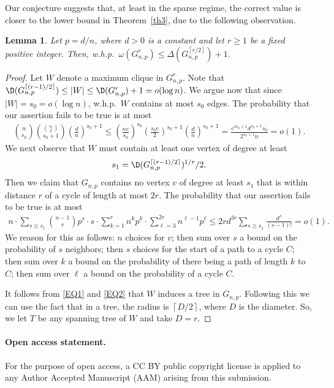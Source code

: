 \documentclass[12pt,a4paper]{article}
\newtheorem{lemma}[theorem]{Lemma}
\newcommand{\rdup}[1]{{\left\lceil #1\right\rceil }}
\newcommand{\bfrac}[2]{\left(\frac{#1}{#2}\right)}
\newcommand{\beq}[2]{\begin{align}\label{#1}#2\end{align}}
\theoremstyle{plain}
\begin{document}
Our conjecture suggests that, at least  in the sparse regime, the correct value is closer to the lower bound in Theorem~\ref{th3}, due to the following observation.
\begin{lemma}\label{omom}
Let $p=d/n$, where $d>0$ is a constant and let $r\geq 1$ be a fixed positive integer. Then, w.h.p.~$\omega(G_{n,p}^r)\leq \Delta(G_{n,p}^{\rdup{r/2}})+1$.
\end{lemma}
\begin{proof}
Let $W$ denote a maximum clique in $G^r_{n,p}$. Note that $\D(G^\rdup{(r-1)/2}_{n,p})\leq |W|\leq \D(G^r_{n,p})+1=o(\log n)$.  We argue now that since $|W|=s_0=o(\log n)$, w.h.p.~$W$ contains at most $s_0$ edges. The probability that our assertion fails to be true is at most
\beq{EQ1}{
  \binom{n}{s_0}\binom{\binom{s_0}{2}}{s_0+1}\bfrac{d}{n}^{s_0+1}\leq \bfrac{ne}{s_0}^{s_0}\bfrac{s_0e}{2}^{s_0+1}\bfrac{d}{n}^{s_0+1}
= \frac{e^{2s_0+1}d^{s_0+1}s_0}{2^{s_0+1}n}=o(1).
}
We next observe that $W$ must contain at least one vertex of degree at least
\[s_1=\D(G^\rdup{(r-1)/2}_{n,p})^{1/r}/2.\] Then we claim that $G_{n,p}$ contains no vertex $v$ of degree at least $s_1$ that is within distance $r$ of a cycle of length at most $2r$. The probability that our assertion fails to be true is at most
\beq{EQ2}{
n\cdot\sum_{s\geq s_1}\binom{n-1}{s}p^s\cdot s\cdot \sum_{k=1}^rn^kp^k\cdot\sum_{\ell=3}^{2r}n^{\ell-1}p^\ell\leq 2rd^{3r}\sum_{s\geq s_1}\frac{d^s}{(s-1)!}=o(1).
}
We reason for this as follows: $n$ choices for $v$; then sum over $s$ a bound on the probability of $s$ neighbors; then $s$ choices for the start of a path to a cycle $C$; then sum over $k$ a bound on the probability of there being a path of length $k$ to $C$; then sum over $\ell$ a bound on the probability of a cycle $C$. 

It follows from \eqref{EQ1} and \eqref{EQ2} that $W$ induces a tree in $G_{n,p}$. Following this we can use the fact that in a tree, the radius is $\rdup{D/2}$, where $D$ is the diameter. So, we let $T$ be any spanning tree of $W$ and take $D=r$.
\end{proof}
\paragraph{Open access statement.} For the purpose of open access,
a CC BY public copyright license is applied
to any Author Accepted Manuscript (AAM)
arising from this submission.





\end{document}
